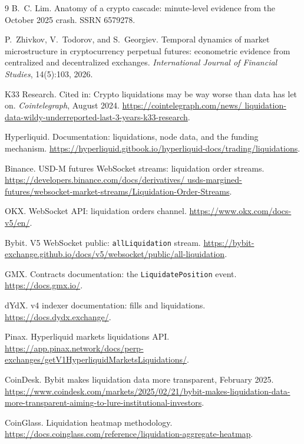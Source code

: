 \documentclass[11pt,a4paper]{article}
\begin{document}
\begin{thebibliography}{9}
B.~C. Lim.
\newblock Anatomy of a crypto cascade: minute-level evidence from the October 2025 crash.
\newblock SSRN 6579278.

P.~Zhivkov, V.~Todorov, and S.~Georgiev.
\newblock Temporal dynamics of market microstructure in cryptocurrency perpetual futures:
econometric evidence from centralized and decentralized exchanges.
\newblock \emph{International Journal of Financial Studies}, 14(5):103, 2026.

K33 Research.
\newblock Cited in: Crypto liquidations may be way worse than data has let on.
\newblock \emph{Cointelegraph}, August 2024.
\newblock \url{https://cointelegraph.com/news/
liquidation-data-wildy-underreported-last-3-years-k33-research}.

Hyperliquid.
\newblock Documentation: liquidations, node data, and the funding mechanism.
\newblock \url{https://hyperliquid.gitbook.io/hyperliquid-docs/trading/liquidations}.

Binance.
\newblock USD-M futures WebSocket streams: liquidation order streams.
\newblock \url{https://developers.binance.com/docs/derivatives/
usds-margined-futures/websocket-market-streams/Liquidation-Order-Streams}.

OKX.
\newblock WebSocket API: liquidation orders channel.
\newblock \url{https://www.okx.com/docs-v5/en/}.

Bybit.
\newblock V5 WebSocket public: \texttt{allLiquidation} stream.
\newblock \url{https://bybit-exchange.github.io/docs/v5/websocket/public/all-liquidation}.

GMX.
\newblock Contracts documentation: the \texttt{LiquidatePosition} event.
\newblock \url{https://docs.gmx.io/}.

dYdX.
\newblock v4 indexer documentation: fills and liquidations.
\newblock \url{https://docs.dydx.exchange/}.

Pinax.
\newblock Hyperliquid markets liquidations API.
\newblock \url{https://app.pinax.network/docs/perp-exchanges/getV1HyperliquidMarketsLiquidations/}.

CoinDesk.
\newblock Bybit makes liquidation data more transparent, February 2025.
\newblock \url{https://www.coindesk.com/markets/2025/02/21/bybit-makes-liquidation-data-more-transparent-aiming-to-lure-institutional-investors}.

CoinGlass.
\newblock Liquidation heatmap methodology.
\newblock \url{https://docs.coinglass.com/reference/liquidation-aggregate-heatmap}.

\end{thebibliography}
\end{document}
